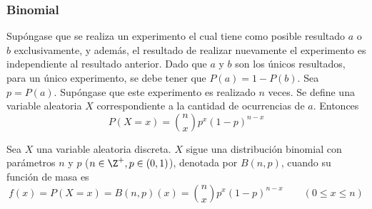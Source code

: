 \subsubsection{Binomial}
\label{dist:binom}
Supóngase que se realiza un experimento el cual tiene como posible
resultado $a$ o $b$ exclusivamente, y además, el resultado
de realizar nuevamente el experimento es independiente al
resultado anterior. Dado que $a$ y $b$ son los únicos resultados,
para un único experimento, se debe tener que
$P(a) = 1 - P(b)$. Sea $p=P(a)$. Supóngase que
este experimento es realizado $n$ veces. Se define una variable
aleatoria $X$ correspondiente a la cantidad de ocurrencias de $a$.
Entonces
\[P(X=x) = \binom{n}{x}p^x(1-p)^{n-x}\]
\begin{Def}
  Sea $X$ una variable aleatoria discreta. $X$ sigue una distribución
  binomial con parámetros $n$ y $p$ ($n\in\Z^+, p\in(0,1)$), denotada por $B(n,p)$,
  cuando su función de masa es
  \[f(x) = P(X=x) = B(n,p)(x) = \binom{n}{x}p^x(1-p)^{n-x}
  \qquad(0\leq x \leq n)\]
\end{Def}

